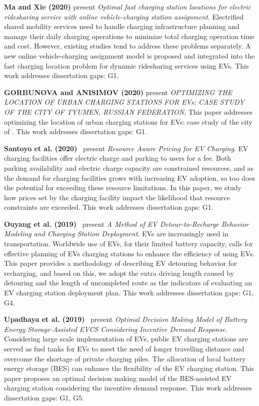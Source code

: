 \documentclass[letterpaper, 12pt, oneside, doublespacing]{Thesis}
\begin{document}
\noindent \textbf{Ma and Xie (2020)} present \textit{Optimal fast charging station locations for electric ridesharing service with online vehicle-charging station assignment}. Electrified shared mobility services need to handle charging infrastructure planning and manage their daily charging operations to minimize total charging operation time and cost. However, existing studies tend to address these problems separately. A new online vehicle-charging assignment model is proposed and integrated into the fast charging location problem for dynamic ridesharing services using EVs. This work addresses dissertation gaps: G1.



\noindent \textbf{GORBUNOVA and ANISIMOV (2020)} present \textit{OPTIMIZING THE LOCATION OF URBAN CHARGING STATIONS FOR EVs: CASE STUDY OF THE CITY OF TYUMEN, RUSSIAN FEDERATION}. This paper addresses optimizing the location of urban charging stations for EVs: case study of the city of . This work addresses dissertation gaps: G1.



\noindent \textbf{Santoyo et al. (2020)}~\cite{resource_aware_2020} present \textit{Resource Aware Pricing for EV Charging}. EV charging facilities offer electric charge and parking to users for a fee. Both parking availability and electric charge capacity are constrained resources, and as the demand for charging facilities grows with increasing EV adoption, so too does the potential for exceeding these resource limitations. In this paper, we study how prices set by the charging facility impact the likelihood that resource constraints are exceeded. This work addresses dissertation gaps: G1.



\noindent \textbf{Ouyang et al. (2019)}~\cite{a_method_2019} present \textit{A Method of EV Detour-to-Recharge Behavior Modeling and Charging Station Deployment}. EVs are increasingly used in transportation. Worldwide use of EVs, for their limited battery capacity, calls for effective planning of EVs charging stations to enhance the efficiency of using EVs. This paper provides a methodology of describing EV detouring behavior for recharging, and based on this, we adopt the extra driving length caused by detouring and the length of uncompleted route as the indicators of evaluating an EV charging station deployment plan. This work addresses dissertation gaps: G1, G4.



\noindent \textbf{Upadhaya et al. (2019)}~\cite{optimal_decision_2019} present \textit{Optimal Decision Making Model of Battery Energy Storage-Assisted EVCS Considering Incentive Demand Response}. Considering large scale implementation of EVs, public EV charging stations are served as fuel tanks for EVs to meet the need of longer travelling distance and overcome the shortage of private charging piles. The allocation of local battery energy storage (BES) can enhance the flexibility of the EV charging station. This paper proposes an optimal decision making model of the BES-assisted EV charging station considering the incentive demand response. This work addresses dissertation gaps: G1, G5.
\end{document}
